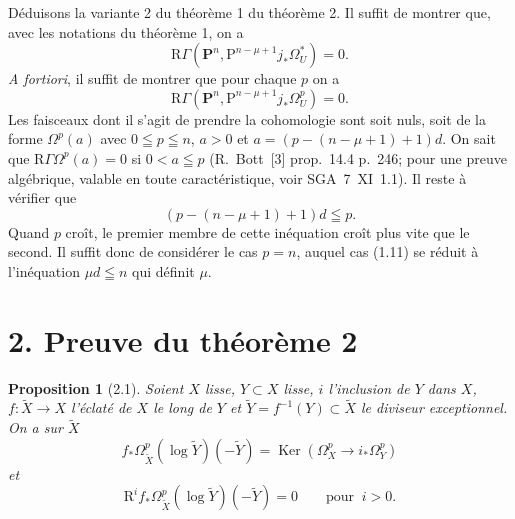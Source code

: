 \documentclass[12pt,a4paper]{article}
\theoremstyle{plain}
\newtheorem{proposition}[theorem]{Proposition}
\theoremstyle{definition}
\DeclareMathOperator{\Ker}{Ker}
\begin{document}
Déduisons la variante 2 du théorème 1 du théorème 2. Il suffit de montrer que, avec les notations du théorème 1, on a
\[
\mathrm{R}\Gamma(\mathbf{P}^n, \mathrm{P}^{n-\mu+1} j_* \Omega_U^*) = 0.
\]
\textit{A fortiori}, il suffit de montrer que pour chaque $p$ on a
\[
\mathrm{R}\Gamma(\mathbf{P}^n, \mathrm{P}^{n-\mu+1} j_* \Omega_U^p) = 0.
\]
Les faisceaux dont il s'agit de prendre la cohomologie sont soit nuls, soit de la forme $\Omega^p(a)$ avec $0 \leqq p \leqq n$, $a > 0$ et $a = (p-(n-\mu+1)+1)d$. On sait que $\mathrm{R}\Gamma\Omega^p(a) = 0$ si $0 < a \leqq p$ (R.~Bott~[3] prop.~14.4 p.~246; pour une preuve algébrique, valable en toute caractéristique, voir SGA~7~XI~1.1). Il reste à vérifier que
\begin{equation}\label{eq:1.11}
(p-(n-\mu+1)+1)d \leqq p.
\tag{1.11}
\end{equation}
Quand $p$ croît, le premier membre de cette inéquation croît plus vite que le second. Il suffit donc de considérer le cas $p = n$, auquel cas (1.11) se réduit à l'inéquation $\mu d \leqq n$ qui définit $\mu$.


\section*{2. Preuve du théorème 2}

\begin{proposition}[2.1]
Soient $X$ lisse, $Y \subset X$ lisse, $i$ l'inclusion de $Y$ dans $X$, $f : \tilde{X} \to X$ l'éclaté de $X$ le long de $Y$ et $\tilde{Y} = f^{-1}(Y) \subset \tilde{X}$ le diviseur exceptionnel. On a sur $\tilde{X}$
\[
f_* \Omega_{\tilde{X}}^p(\log \tilde{Y})(-\tilde{Y}) = \Ker(\Omega_X^p \to i_* \Omega_Y^p)
\]
et
\[
\mathrm{R}^i f_* \Omega_{\tilde{X}}^p(\log \tilde{Y})(-\tilde{Y}) = 0 \qquad \text{pour }\ i > 0.
\]
\end{proposition}
\end{document}
